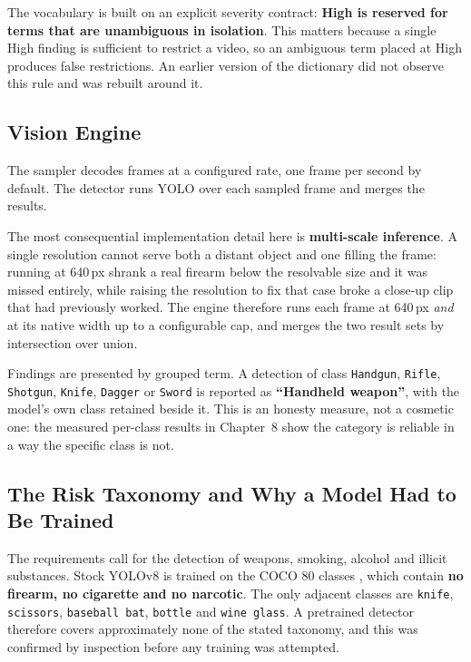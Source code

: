 \documentclass[
12pt,
a4paper,
oneside
]{report}
\begin{document}
The vocabulary is built on an explicit severity contract: \textbf{High is
reserved for terms that are unambiguous in isolation}. This matters because a
single High finding is sufficient to restrict a video, so an ambiguous term
placed at High produces false restrictions. An earlier version of the dictionary
did not observe this rule and was rebuilt around it.

\subsection{Vision Engine}

The sampler decodes frames at a configured rate, one frame per second by
default. The detector runs YOLO over each sampled frame and merges the results.

The most consequential implementation detail here is \textbf{multi-scale
inference}. A single resolution cannot serve both a distant object and one
filling the frame: running at 640\,px shrank a real firearm below the resolvable
size and it was missed entirely, while raising the resolution to fix that case
broke a close-up clip that had previously worked. The engine therefore runs each
frame at 640\,px \emph{and} at its native width up to a configurable cap, and
merges the two result sets by intersection over union.

Findings are presented by grouped term. A detection of class \texttt{Handgun},
\texttt{Rifle}, \texttt{Shotgun}, \texttt{Knife}, \texttt{Dagger} or
\texttt{Sword} is reported as \textbf{``Handheld weapon''}, with the model's own
class retained beside it. This is an honesty measure, not a cosmetic one: the
measured per-class results in Chapter~8 show the category is reliable in a way
the specific class is not.

\subsection{The Risk Taxonomy and Why a Model Had to Be Trained}
\label{sec:taxonomy}

The requirements call for the detection of weapons, smoking, alcohol and illicit
substances. Stock YOLOv8 is trained on the COCO 80 classes \cite{Lin2014}, which
contain \textbf{no firearm, no cigarette and no narcotic}. The only adjacent
classes are \texttt{knife}, \texttt{scissors}, \texttt{baseball bat},
\texttt{bottle} and \texttt{wine glass}. A pretrained detector therefore covers
approximately none of the stated taxonomy, and this was confirmed by inspection
before any training was attempted.
\end{document}
